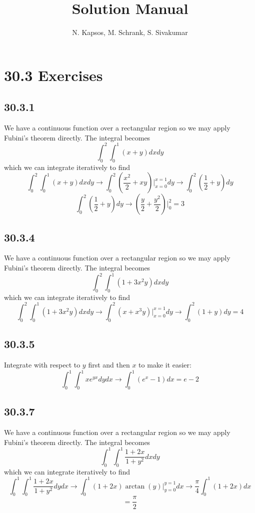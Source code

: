 \documentclass{article}
\title{Solution Manual}
\author{N. Kapsos, M. Schrank, S. Sivakumar}
\date{}
\begin{document}
\maketitle
\setcounter{secnumdepth}{0}

\section{30.3 Exercises}

\subsection{30.3.1}

We have a continuous function over a rectangular region so we may apply Fubini's theorem directly. The integral becomes $$\int_0^2\int_0^1(x+y)dxdy$$ which we can integrate iteratively to find $$\int_0^2\int_0^1(x+y)dxdy \to \int_0^2 \left(\frac{x^2}{2}+xy\right)\bigg|_{x=0}^{x=1}dy \to \int_0^2 \left(\frac{1}{2}+y\right)dy$$
$$\int_0^2 \left(\frac{1}{2}+y\right)dy \to \left(\frac{y}{2} + \frac{y^2}{2}\right)\bigg|_0^2 = 3$$

\subsection{30.3.4}

We have a continuous function over a rectangular region so we may apply Fubini's theorem directly. The integral becomes $$\int_0^2\int_0^1 (1+3x^2y)dxdy$$ which we can integrate iteratively to find $$\int_0^2\int_0^1 (1+3x^2y)dxdy \to \int_0^2 (x+x^3y)\bigg|_{x=0}^{x=1}dy \to \int_0^2(1+y)dy = 4$$

\subsection{30.3.5}

Integrate with respect to $y$ first and then $x$ to make it easier:
$$\int_0^1\int_0^1 xe^{yx}dydx \to \int_0^1 (e^x-1)dx = e-2$$

\subsection{30.3.7}

We have a continuous function over a rectangular region so we may apply Fubini's theorem directly. The integral becomes $$\int_0^1\int_0^1 \frac{1+2x}{1+y^2}dxdy$$ which we can integrate iteratively to find $$\int_0^1\int_0^1 \frac{1+2x}{1+y^2}dydx \to \int_0^1(1+2x)\arctan(y)\bigg|_{y=0}^{y=1}dx \to \frac{\pi}{4}\int_0^1 (1+2x)dx$$
$$= \frac{\pi}{2}$$
\end{document}
